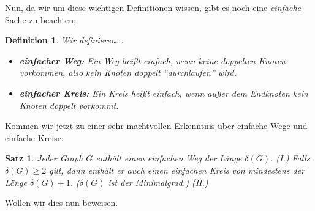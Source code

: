 \documentclass{article}
\newtheorem{theorem}{Satz} %
\newtheorem{definition}{Definition}
\theoremstyle{plain}
\begin{document}
\vfill
\newpage
Nun, da wir um diese wichtigen Definitionen wissen, gibt es noch eine \emph{einfache} Sache zu beachten;\\
\begin{definition}
	Wir definieren...
	\begin{itemize}
		\item \textbf{einfacher Weg:} Ein Weg heißt \emph{einfach}, wenn keine doppelten Knoten vorkommen, also kein Knoten doppelt "`durchlaufen"' wird.
		\item \textbf{einfacher Kreis:} Ein Kreis heißt \emph{einfach}, wenn außer dem Endknoten kein Knoten doppelt vorkommt.\cite[S.~9]{bue_1}
	\end{itemize}
\end{definition}
Kommen wir jetzt zu einer sehr machtvollen Erkenntnis über einfache Wege und einfache Kreise:\\
\begin{theorem}
	Jeder Graph $G$ enthält einen einfachen Weg der Länge $\delta(G)$. \emph{(I.)} Falls $\delta(G) \geq 2$ gilt, dann enthält er auch einen einfachen Kreis von mindestens der Länge $\delta(G) + 1$. ($\delta(G)$ ist der Minimalgrad.) \emph{(II.)}\cite[S.~9]{bue_1}
\end{theorem}
Wollen wir dies nun beweisen.\\
\end{document}

